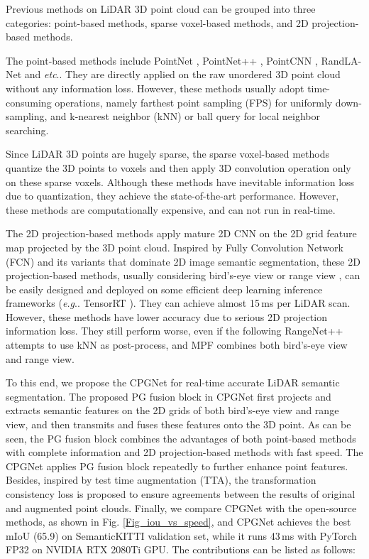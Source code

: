 \documentclass[letterpaper, 10 pt, conference]{ieeeconf}
\makeatletter
\DeclareRobustCommand\onedot{\futurelet\@let@token\@onedot}
\def\@onedot{\ifx\@let@token.\else.\null\fi\xspace}
\def\eg{\emph{e.g}\onedot} \def\Eg{\emph{E.g}\onedot}
\def\etc{\emph{etc}\onedot} \def\vs{\emph{vs}\onedot}
\makeatother
\begin{document}
Previous methods on LiDAR 3D point cloud can be grouped into three categories: point-based methods, sparse voxel-based methods, and 2D projection-based methods.

The point-based methods include PointNet \cite{qi2017pointnet}, PointNet++ \cite{qi2017pointnetplus}, PointCNN \cite{li2018pointcnn}, RandLA-Net \cite{hu2020randla} and \etc They are directly applied on the raw unordered 3D point cloud without any information loss. However, these methods usually adopt time-consuming operations, namely farthest point sampling (FPS) for uniformly down-sampling, and k-nearest neighbor (kNN) or ball query for local neighbor searching.

Since LiDAR 3D points are hugely sparse, the sparse voxel-based methods quantize the 3D points to voxels and then apply 3D convolution operation only on these sparse voxels. Although these methods have inevitable information loss due to quantization, they achieve the state-of-the-art performance. However, these methods are computationally expensive, and can not run in real-time.

The 2D projection-based methods apply mature 2D CNN on the 2D grid feature map projected by the 3D point cloud. Inspired by Fully Convolution Network (FCN) \cite{long2015fully} and its variants \cite{noh2015learning, zhao2017pyramid, chen2017deeplab, chen2017rethinking, chen2018encoder} that dominate 2D image semantic segmentation, these 2D projection-based methods, usually considering bird’s-eye view \cite{lang2019pointpillars} or range view \cite{wang2018pointseg}, can be easily designed and deployed on some efficient deep learning inference frameworks (\eg TensorRT \cite{vanholder2016efficient}). They can achieve almost 15\,ms per LiDAR scan. However, these methods have lower accuracy due to serious 2D projection information loss. They still perform worse, even if the following RangeNet++ \cite{milioto2019rangenetplus} attempts to use kNN as post-process, and MPF \cite{alnaggar2021multi} combines both bird’s-eye view and range view.


To this end, we propose the CPGNet for real-time accurate LiDAR semantic segmentation. The proposed PG fusion block in CPGNet first projects and extracts semantic features on the 2D grids of both bird’s-eye view and range view, and then transmits and fuses these features onto the 3D point. As can be seen, the PG fusion block combines the advantages of both point-based methods with complete information and 2D projection-based methods with fast speed. The CPGNet applies PG fusion block repeatedly to further enhance point features. Besides, inspired by test time augmentation (TTA), the transformation consistency loss is proposed to ensure agreements between the results of original and augmented point clouds. Finally, we 
compare CPGNet with the open-source methods, as shown in Fig. \ref{Fig_iou_vs_speed}, and CPGNet achieves the best mIoU (65.9) on SemanticKITTI \cite{behley2019semantickitti} validation set, while it runs 43\,ms with PyTorch FP32 on NVIDIA RTX 2080Ti GPU. The contributions can be listed as follows:
\end{document}
